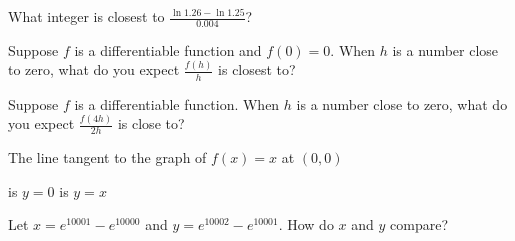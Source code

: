 \documentclass{ximera}
\newcommand{\recommendation}[1]{}
\newcommand{\GoodQuestions}[1]{}
\begin{document}
\begin{shuffle}
\begin{problem}
  What integer is closest to $\frac{\ln 1.26 - \ln 1.25}{0.004}$?
  \begin{multipleChoice}
  \end{multipleChoice}
\end{problem}

\begin{problem}
  Suppose $f$ is a differentiable function and $f(0) = 0$.  When $h$
  is a number close to zero, what do you expect $\frac{f(h)}{h}$ is
  closest to?
  \begin{multipleChoice}
  \end{multipleChoice}
\end{problem}

\begin{problem}
  Suppose $f$ is a differentiable function.  When $h$ is a number
  close to zero, what do you expect $\frac{f(4h)}{2h}$ is close to?
  \begin{multipleChoice}
  \end{multipleChoice}
\end{problem}




\begin{problem}
  \recommendation{Vic} \GoodQuestions{Subject: Tangents, velocities,
    and other rates of change 2P}
  
  The line tangent to the graph of $f(x)=x$ at $(0,0)$
  \begin{multipleChoice}
  \choice is $y=0$
  \choice is $y=x$
  \end{multipleChoice}
\end{problem}



\begin{problem}
  Let $x = e^{10001} - e^{10000}$ and $y = e^{10002} - e^{10001}$.  How do $x$ and $y$ compare?
  \begin{multipleChoice}
  \end{multipleChoice}
\end{problem}


\end{shuffle}
\end{document}
